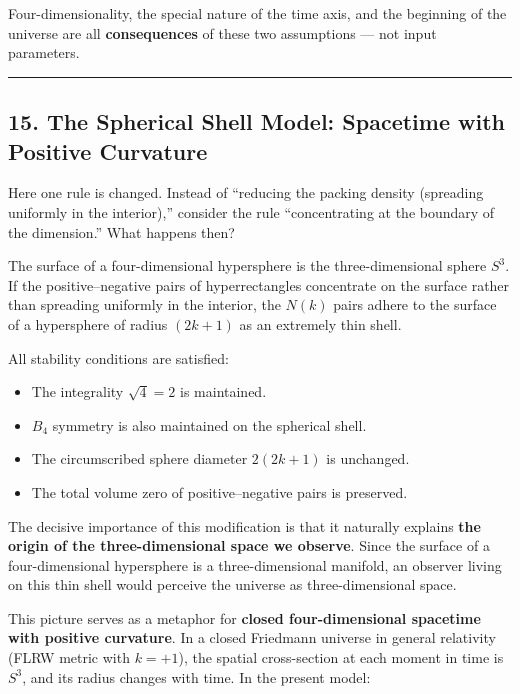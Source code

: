 \documentclass[a4paper,11pt]{article}
\theoremstyle{definition}
\providecommand{\tightlist}{\setlength{\itemsep}{0pt}\setlength{\parskip}{0pt}}
\begin{document}
Four-dimensionality, the special nature of the time axis, and the
beginning of the universe are all \textbf{consequences} of these two
assumptions --- not input parameters.

\begin{center}\rule{0.5\linewidth}{0.5pt}\end{center}

\subsection{15. The Spherical Shell Model: Spacetime with Positive
Curvature}\label{the-spherical-shell-model-spacetime-with-positive-curvature}

Here one rule is changed. Instead of ``reducing the packing density
(spreading uniformly in the interior),'' consider the rule
``concentrating at the boundary of the dimension.'' What happens then?

The surface of a four-dimensional hypersphere is the three-dimensional
sphere \(S^3\). If the positive--negative pairs of hyperrectangles
concentrate on the surface rather than spreading uniformly in the
interior, the \(N(k)\) pairs adhere to the surface of a hypersphere of
radius \((2k+1)\) as an extremely thin shell.

All stability conditions are satisfied:

\begin{itemize}
\tightlist
\item
  The integrality \(\sqrt{4} = 2\) is maintained.
\item
  \(B_4\) symmetry is also maintained on the spherical shell.
\item
  The circumscribed sphere diameter \(2(2k+1)\) is unchanged.
\item
  The total volume zero of positive--negative pairs is preserved.
\end{itemize}

The decisive importance of this modification is that it naturally
explains \textbf{the origin of the three-dimensional space we observe}.
Since the surface of a four-dimensional hypersphere is a
three-dimensional manifold, an observer living on this thin shell would
perceive the universe as three-dimensional space.

This picture serves as a metaphor for \textbf{closed four-dimensional
spacetime with positive curvature}. In a closed Friedmann universe in
general relativity (FLRW metric with \(k = +1\)), the spatial
cross-section at each moment in time is \(S^3\), and its radius changes
with time. In the present model:
\end{document}
